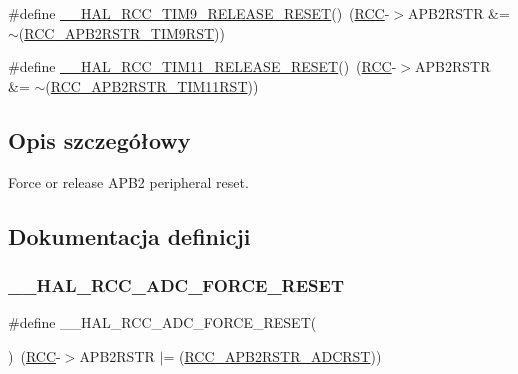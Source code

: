 \begin{DoxyCompactItemize}
\item 
\#define \hyperlink{group___r_c_c___a_p_b2___force___release___reset_ga71fee37e3aff2c5040e2e9f4e153f4ff}{\+\_\+\+\_\+\+H\+A\+L\+\_\+\+R\+C\+C\+\_\+\+T\+I\+M9\+\_\+\+R\+E\+L\+E\+A\+S\+E\+\_\+\+R\+E\+S\+ET}()~(\hyperlink{group___peripheral__declaration_ga74944438a086975793d26ae48d5882d4}{R\+CC}-\/$>$A\+P\+B2\+R\+S\+TR \&= $\sim$(\hyperlink{group___peripheral___registers___bits___definition_gab3aa588d4814a289d939e111492724af}{R\+C\+C\+\_\+\+A\+P\+B2\+R\+S\+T\+R\+\_\+\+T\+I\+M9\+R\+ST}))
\item 
\#define \hyperlink{group___r_c_c___a_p_b2___force___release___reset_gab66378d2b26c2c47522f268e129b6709}{\+\_\+\+\_\+\+H\+A\+L\+\_\+\+R\+C\+C\+\_\+\+T\+I\+M11\+\_\+\+R\+E\+L\+E\+A\+S\+E\+\_\+\+R\+E\+S\+ET}()~(\hyperlink{group___peripheral__declaration_ga74944438a086975793d26ae48d5882d4}{R\+CC}-\/$>$A\+P\+B2\+R\+S\+TR \&= $\sim$(\hyperlink{group___peripheral___registers___bits___definition_ga9651c8201d42ba03bb1bf89d9d39e60c}{R\+C\+C\+\_\+\+A\+P\+B2\+R\+S\+T\+R\+\_\+\+T\+I\+M11\+R\+ST}))
\end{DoxyCompactItemize}


\subsection{Opis szczegółowy}
Force or release A\+P\+B2 peripheral reset. 



\subsection{Dokumentacja definicji}
\mbox{\label{group___r_c_c___a_p_b2___force___release___reset_ga915c2f73eef5fc0e95d76219280ef6c0}} 
\subsubsection{\texorpdfstring{\+\_\+\+\_\+\+H\+A\+L\+\_\+\+R\+C\+C\+\_\+\+A\+D\+C\+\_\+\+F\+O\+R\+C\+E\+\_\+\+R\+E\+S\+ET}{\_\_HAL\_RCC\_ADC\_FORCE\_RESET}}
{\footnotesize\ttfamily \#define \+\_\+\+\_\+\+H\+A\+L\+\_\+\+R\+C\+C\+\_\+\+A\+D\+C\+\_\+\+F\+O\+R\+C\+E\+\_\+\+R\+E\+S\+ET(\begin{DoxyParamCaption}{ }\end{DoxyParamCaption})~(\hyperlink{group___peripheral__declaration_ga74944438a086975793d26ae48d5882d4}{R\+CC}-\/$>$A\+P\+B2\+R\+S\+TR $\vert$= (\hyperlink{group___peripheral___registers___bits___definition_ga1374d6eae8e7d02d1ad457b65f374a67}{R\+C\+C\+\_\+\+A\+P\+B2\+R\+S\+T\+R\+\_\+\+A\+D\+C\+R\+ST}))}



